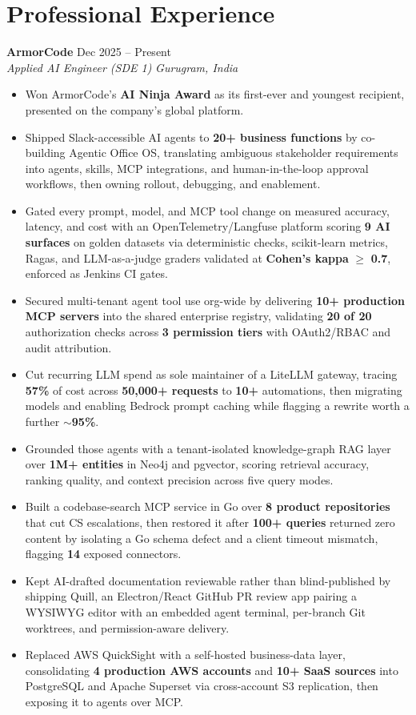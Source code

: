 \documentclass[letterpaper,10pt]{article}
\newcommand{\resumeItem}[1]{\item\footnotesize{#1}}
\newcommand{\resumeRole}[4]{
  \textbf{#1} \hfill #2\\
  \textit{#3} \hfill \textit{#4}
}
\begin{document}
\section{Professional Experience}
\resumeRole{ArmorCode}{Dec 2025 -- Present}{Applied AI Engineer (SDE 1)}{Gurugram, India}
\begin{itemize}[leftmargin=0.16in, itemsep=0pt, topsep=1pt]
  \resumeItem{Won ArmorCode's \textbf{AI Ninja Award} as its first-ever and youngest recipient, presented on the company's global platform.}
  \resumeItem{Shipped Slack-accessible AI agents to \textbf{20+ business functions} by co-building Agentic Office OS, translating ambiguous stakeholder requirements into agents, skills, MCP integrations, and human-in-the-loop approval workflows, then owning rollout, debugging, and enablement.}
  \resumeItem{Gated every prompt, model, and MCP tool change on measured accuracy, latency, and cost with an OpenTelemetry/Langfuse platform scoring \textbf{9 AI surfaces} on golden datasets via deterministic checks, scikit-learn metrics, Ragas, and LLM-as-a-judge graders validated at \textbf{Cohen's kappa} $\geq$ \textbf{0.7}, enforced as Jenkins CI gates.}
  \resumeItem{Secured multi-tenant agent tool use org-wide by delivering \textbf{10+ production MCP servers} into the shared enterprise registry, validating \textbf{20 of 20} authorization checks across \textbf{3 permission tiers} with OAuth2/RBAC and audit attribution.}
  \resumeItem{Cut recurring LLM spend as sole maintainer of a LiteLLM gateway, tracing \textbf{57\%} of cost across \textbf{50,000+ requests} to \textbf{10+} automations, then migrating models and enabling Bedrock prompt caching while flagging a rewrite worth a further \textbf{$\sim$95\%}.}
  \resumeItem{Grounded those agents with a tenant-isolated knowledge-graph RAG layer over \textbf{1M+ entities} in Neo4j and pgvector, scoring retrieval accuracy, ranking quality, and context precision across five query modes.}
  \resumeItem{Built a codebase-search MCP service in Go over \textbf{8 product repositories} that cut CS escalations, then restored it after \textbf{100+ queries} returned zero content by isolating a Go schema defect and a client timeout mismatch, flagging \textbf{14} exposed connectors.}
  \resumeItem{Kept AI-drafted documentation reviewable rather than blind-published by shipping Quill, an Electron/React GitHub PR review app pairing a WYSIWYG editor with an embedded agent terminal, per-branch Git worktrees, and permission-aware delivery.}
  \resumeItem{Replaced AWS QuickSight with a self-hosted business-data layer, consolidating \textbf{4 production AWS accounts} and \textbf{10+ SaaS sources} into PostgreSQL and Apache Superset via cross-account S3 replication, then exposing it to agents over MCP.}
\end{itemize}
\end{document}
